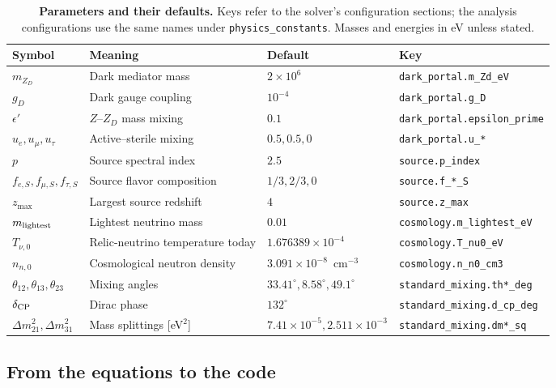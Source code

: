 \documentclass[11pt,a4paper]{article}
\newcommand{\mzd}{m_{Z_D}}
\newcommand{\gd}{g_D}
\newcommand{\epsp}{\epsilon'}
\newcommand{\Tnu}{T_{\nu,0}}
\begin{document}
\begin{table}[h]
\centering
\caption{\textbf{Parameters and their defaults.} Keys refer to the solver's configuration
sections; the analysis configurations use the same names under \texttt{physics\_constants}.
Masses and energies in eV unless stated.}
\label{tab:params}
\footnotesize
\setlength{\tabcolsep}{4pt}
\begin{tabular}{llll}
\toprule
Symbol & Meaning & Default & Key \\
\midrule
$\mzd$ & Dark mediator mass & $2\times10^{6}$ & \texttt{dark\_portal.m\_Zd\_eV} \\
$\gd$ & Dark gauge coupling & $10^{-4}$ & \texttt{dark\_portal.g\_D} \\
$\epsp$ & $Z$--$Z_D$ mass mixing & $0.1$ & \texttt{dark\_portal.epsilon\_prime} \\
$u_e, u_\mu, u_\tau$ & Active--sterile mixing & $0.5, 0.5, 0$ & \texttt{dark\_portal.u\_*} \\
$p$ & Source spectral index & $2.5$ & \texttt{source.p\_index} \\
$f_{e,S}, f_{\mu,S}, f_{\tau,S}$ & Source flavor composition & $1/3, 2/3, 0$ & \texttt{source.f\_*\_S} \\
$z_{\max}$ & Largest source redshift & $4$ & \texttt{source.z\_max} \\
$m_{\rm lightest}$ & Lightest neutrino mass & $0.01$ & \texttt{cosmology.m\_lightest\_eV} \\
$\Tnu$ & Relic-neutrino temperature today & $1.676389\times10^{-4}$ & \texttt{cosmology.T\_nu0\_eV} \\
$n_{n,0}$ & Cosmological neutron density & $3.091\times10^{-8}$~cm$^{-3}$ & \texttt{cosmology.n\_n0\_cm3} \\
$\theta_{12}, \theta_{13}, \theta_{23}$ & Mixing angles & $33.41^\circ, 8.58^\circ, 49.1^\circ$ & \texttt{standard\_mixing.th*\_deg} \\
$\delta_{\rm CP}$ & Dirac phase & $132^\circ$ & \texttt{standard\_mixing.d\_cp\_deg} \\
$\Delta m^2_{21}, \Delta m^2_{31}$ & Mass splittings [eV$^2$] & $7.41\times10^{-5}, 2.511\times10^{-3}$ & \texttt{standard\_mixing.dm*\_sq} \\
\bottomrule
\end{tabular}
\end{table}

\subsection{From the equations to the code}
\end{document}
